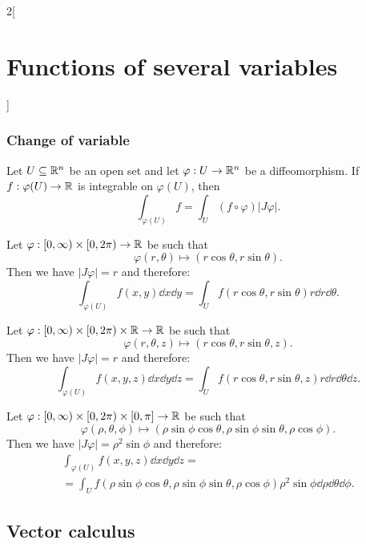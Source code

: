 \documentclass[../../../main.tex]{subfiles}
\begin{document}
\begin{multicols}{2}[\section{Functions of several variables}]
\subsubsection*{Change of variable}
\begin{theorem}
Let $U\subseteq\mathbb{R}^n$ be an open set and let $\varphi:U\rightarrow\mathbb{R}^n$ be a diffeomorphism. If $f:\varphi(U)\rightarrow\mathbb{R} $ is integrable on $\varphi(U)$, then $$\int_{\varphi(U)} f=\int_U(f\circ\varphi)|J\varphi|.$$
\end{theorem}
\begin{corollary}
Let $\varphi:[0,\infty)\times[0,2\pi)\rightarrow\mathbb{R} $ be such that
$$\varphi(r,\theta)\longmapsto(r\cos\theta,r\sin\theta).$$
Then we have $|J\varphi|=r$ and therefore: $$\int_{\varphi(U)}f(x,y)\dd x\dd y=\int_Uf(r\cos\theta,r\sin\theta)r\dd r \dd\theta.$$
\end{corollary}
\begin{corollary}
Let $\varphi:[0,\infty)\times[0,2\pi)\times\mathbb{R} \rightarrow\mathbb{R} $ be such that $$\varphi(r,\theta,z)\longmapsto(r\cos\theta,r\sin\theta,z).$$
Then we have $|J\varphi|=r$ and therefore: $$\int_{\varphi(U)}f(x,y,z)\dd x\dd y\dd z=\int_Uf(r\cos\theta,r\sin\theta,z)r\dd r \dd\theta \dd z.$$
\end{corollary}
\begin{corollary}
Let $\varphi:[0,\infty)\times[0,2\pi)\times[0,\pi]\rightarrow\mathbb{R} $ be such that $$\varphi(\rho,\theta,\phi)\longmapsto(\rho\sin\phi\cos\theta,\rho\sin\phi\sin\theta,\rho\cos\phi).$$
Then we have $|J\varphi|=\rho^2\sin\phi$ and therefore:
\begin{multline*}
    \int_{\varphi(U)}f(x,y,z)\dd x\dd y\dd z=\\=\int_Uf(\rho\sin\phi\cos\theta,\rho\sin\phi\sin\theta,\rho\cos\phi)\rho^2\sin\phi \dd \rho \dd \theta \dd \phi.
\end{multline*}
\end{corollary}
\subsection{Vector calculus}

\end{multicols}
\end{document}
